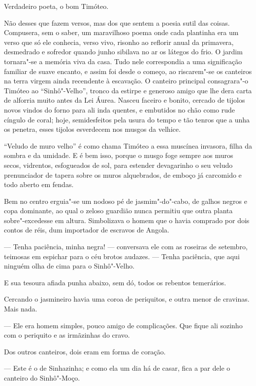Verdadeiro poeta, o bom Timóteo.

Não desses que fazem versos, mas dos que sentem a poesia sutil das
coisas. Compusera, sem o saber, um maravilhoso poema onde cada plantinha
era um verso que só ele conhecia, verso vivo, risonho ao reflorir anual
da primavera, desmedrado e sofredor quando junho sibilava no ar os
látegos do frio. O jardim tornara"-se a memória viva da casa. Tudo nele
correspondia a uma significação familiar de suave encanto, e assim foi
desde o começo, ao riscarem"-se os canteiros na terra virgem ainda
recendente à escavação. O canteiro principal consagrara"-o Timóteo ao
``Sinhô"-Velho'', tronco da estirpe e generoso amigo que lhe dera carta
de alforria muito antes da Lei Áurea. Nasceu faceiro e bonito, cercado
de tijolos novos vindos do forno para ali inda quentes, e embutidos no
chão como rude cíngulo de coral; hoje, semidesfeitos pela usura do tempo
e tão tenros que a unha os penetra, esses tijolos esverdecem nos musgos
da velhice.

``Veludo de muro velho'' é como chama Timóteo a essa muscínea invasora,
filha da sombra e da umidade. E é bem isso, porque o musgo foge sempre
aos muros secos, vidrentos, esfogueados de sol, para estender
devagarinho o seu veludo prenunciador de tapera sobre os muros
alquebrados, de emboço já carcomido e todo aberto em fendas.

Bem no centro erguia"-se um nodoso pé de jasmim"-do"-cabo, de galhos negros
e copa dominante, ao qual o zeloso guardião nunca permitiu que outra
planta sobre"-excedesse em altura. Simbolizava o homem que o havia
comprado por dois contos de réis, dum importador de escravos de Angola.

--- Tenha paciência, minha negra! --- conversava ele com as roseiras de
setembro, teimosas em espichar para o céu brotos audazes. --- Tenha
paciência, que aqui ninguém olha de cima para o Sinhô"-Velho.

E sua tesoura afiada punha abaixo, sem dó, todos os rebentos temerários.

Cercando o jasmineiro havia uma coroa de periquitos, e outra menor de
cravinas. Mais nada.

--- Ele era homem simples, pouco amigo de complicações. Que fique ali
sozinho com o periquito e as irmãzinhas do cravo.

Dos outros canteiros, dois eram em forma de coração.

--- Este é o de Sinhazinha; e como ela um dia há de casar, fica a par
dele o canteiro do Sinhô"-Moço.

